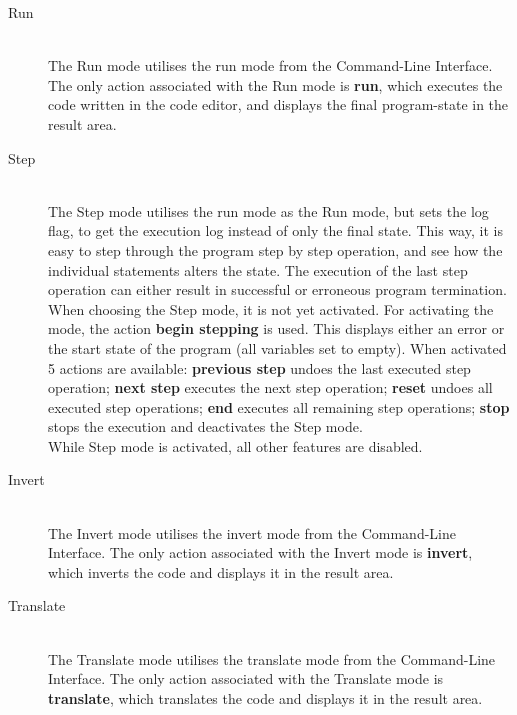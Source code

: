 \begin{description}

  \item[Run]~\\
    The Run mode utilises the run mode from the Command-Line Interface. The only action associated with the Run mode is  \textbf{run}, which executes the code written in the code editor, and displays the final program-state in the result area.\\

  \item[Step]~\\
    The Step mode utilises the run mode as the Run mode, but sets the \-\-log flag, to get the execution log instead of only the final state. This way, it is easy to step through the program step by step operation, and see how the individual statements alters the state.
    The execution of the last step operation can either result in successful or erroneous program termination.
    When choosing the Step mode, it is not yet activated.
    For activating the mode, the action  \textbf{begin stepping} is used.
    This displays either an error or the start state of the program (all variables set to empty).
    When activated 5 actions are available:
     \textbf{previous step} undoes the last executed step operation;
     \textbf{next step} executes the next step operation;
     \textbf{reset} undoes all executed step operations;
     \textbf{end} executes all remaining step operations;
     \textbf{stop} stops the execution and deactivates the Step mode.\\
    While Step mode is activated, all other features are disabled.\\

  \item[Invert]~\\
    The Invert mode utilises the invert mode from the Command-Line Interface. The only action associated with the Invert mode is  \textbf{invert}, which inverts the code and displays it in the result area.\\

  \item[Translate]~\\
    The Translate mode utilises the translate mode from the Command-Line Interface.
    The only action associated with the Translate mode is  \textbf{translate}, which translates the code and displays it in the result area.\\

\end{description}


